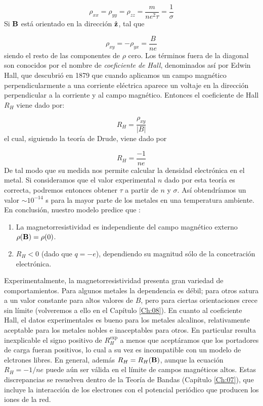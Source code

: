 \begin{equation}
	\rho_{xx} = \rho_{yy} = \rho_{zz} = \frac{m}{ne^2 \tau} = \frac{1}{\sigma}
\end{equation}
Si $\mathbf{B}$ está orientado en la dirección $\hat{\mathbf{z}}$, tal que 

\begin{equation}
	\rho_{xy} = - \rho_{yx} = \frac{B}{ne}
\end{equation}
siendo el resto de las componentes de $\rho$ cero. Los términos fuera de la diagonal son conocidos por el nombre de \textit{coeficiente de Hall}, denominados así por Edwin Hall, que descubrió en 1879 que cuando aplicamos un campo magnético perpendicularmente a una corriente eléctrica aparece un voltaje en la dirección perpendicular a la corriente y al campo magnético. Entonces el coeficiente de Hall $R_H$ viene dado por:

\begin{equation}
	R_H = \frac{\rho_{xy}}{|B|}
\end{equation}
el cual, siguiendo la teoría de Drude, viene dado por

\begin{equation}
	R_H = \frac{-1}{ne}
\end{equation}
De tal modo que su medida nos permite calcular la densidad electrónica en el metal. Si consideramos que el valor experimental $n$ dado por esta teoría es correcta, podremos entonces obtener $\tau$ a partir de $n$ y $\sigma$. Así obtendríamos un valor $\sim 10^{-14}$ s para la mayor parte de los metales en una temperatura ambiente. En conclusión, nuestro modelo predice que :

\begin{enumerate}
	\item La magnetorresistividad es independiente del campo magnético externo $\rho(\mathbf{B})=\rho(0)$.
	\item $R_H<0$ (dado que $q=-e$), dependiendo su magnitud sólo de la concetración electrónica. 
\end{enumerate}
Experimentalmente, la magnetorresistividad presenta gran variedad de comportamientos. Para algunos metales la dependencia es débil; para otros satura a un valor constante para altos valores de $B$, pero para ciertas orientaciones crece sin límite (volveremos a ello en el Capítulo \ref{Ch:08}). En cuanto al coeficiente Hall, el datos experimentales es bueno para los metales alcalinos, relativamente aceptable para los metales nobles e inaceptables para otros. En particular resulta inexplicable el signo positivo de $R_H^{\text{exp}}$ a menos que aceptáramos que los portadores de carga fueran positivos, lo cual a su vez es incompatible con un modelo de elctrones libres. En general, además $R_H = R_H (\mathbf{B})$, aunque la ecuación $R_H=-1/ne$ puede aún ser válida en el límite de campos magnéticos altos. Estas discrepancias se resuelven dentro de la Teoría de Bandas (Capítulo \ref{Ch:07}), que incluye la interacción de los electrones con el potencial periódico que producen los iones de la red.

